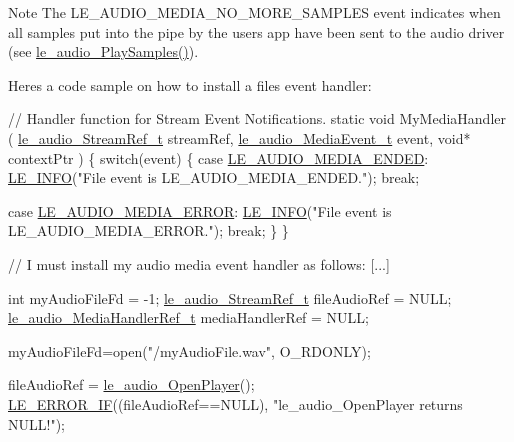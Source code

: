 \begin{DoxyNote}{Note}
The {\ttfamily L\+E\+\_\+\+A\+U\+D\+I\+O\+\_\+\+M\+E\+D\+I\+A\+\_\+\+N\+O\+\_\+\+M\+O\+R\+E\+\_\+\+S\+A\+M\+P\+L\+E\+S} event indicates when all samples put into the pipe by the user\textquotesingle{}s app have been sent to the audio driver (see \hyperlink{le__audio__interface_8h_afd37d59ab8207338da197554f49d7ff0}{le\+\_\+audio\+\_\+\+Play\+Samples()}).
\end{DoxyNote}
Here\textquotesingle{}s a code sample on how to install a file\textquotesingle{}s event handler\+: 
\begin{DoxyCode}
\textcolor{comment}{// Handler function for Stream Event Notifications.}
\textcolor{keyword}{static} \textcolor{keywordtype}{void} MyMediaHandler
(
    \hyperlink{le__audio__interface_8h_a9a46ff5a5afa61f1bc76120ab9e4da0a}{le\_audio\_StreamRef\_t}          streamRef,
    \hyperlink{le__audio__interface_8h_aaf870f5f30f4f6f65efb873c5d0cb5f1}{le\_audio\_MediaEvent\_t}         event,
    \textcolor{keywordtype}{void}*                         contextPtr
)
\{
    \textcolor{keywordflow}{switch}(event)
    \{
        \textcolor{keywordflow}{case} \hyperlink{le__audio__interface_8h_aaf870f5f30f4f6f65efb873c5d0cb5f1a7dbc0c9a2c3839d3db974c5aa5be344d}{LE\_AUDIO\_MEDIA\_ENDED}:
            \hyperlink{le__log_8h_a23e6d206faa64f612045d688cdde5808}{LE\_INFO}(\textcolor{stringliteral}{"File event is LE\_AUDIO\_MEDIA\_ENDED."});
            \textcolor{keywordflow}{break};

        \textcolor{keywordflow}{case} \hyperlink{le__audio__interface_8h_aaf870f5f30f4f6f65efb873c5d0cb5f1a5f7de6714ea54f09d036a87dd1c63a50}{LE\_AUDIO\_MEDIA\_ERROR}:
            \hyperlink{le__log_8h_a23e6d206faa64f612045d688cdde5808}{LE\_INFO}(\textcolor{stringliteral}{"File event is LE\_AUDIO\_MEDIA\_ERROR."});
            \textcolor{keywordflow}{break};
    \}
\}


\textcolor{comment}{// I must install my audio media event handler as follows:}
[...]

\textcolor{keywordtype}{int} myAudioFileFd = -1;
\hyperlink{le__audio__interface_8h_a9a46ff5a5afa61f1bc76120ab9e4da0a}{le\_audio\_StreamRef\_t} fileAudioRef = NULL;
\hyperlink{le__audio__interface_8h_a390b011cbb6f745c46e861d315af0bbe}{le\_audio\_MediaHandlerRef\_t} mediaHandlerRef = NULL;

myAudioFileFd=open(\textcolor{stringliteral}{"/myAudioFile.wav"}, O\_RDONLY);

fileAudioRef = \hyperlink{le__audio__interface_8h_a92eb1b6377f50ff07b97c5b8546f01ec}{le\_audio\_OpenPlayer}();
\hyperlink{le__log_8h_aceaf11a11691d6c676e36dd317b38dbd}{LE\_ERROR\_IF}((fileAudioRef==NULL), \textcolor{stringliteral}{"le\_audio\_OpenPlayer returns NULL!"});


\end{DoxyCode}
